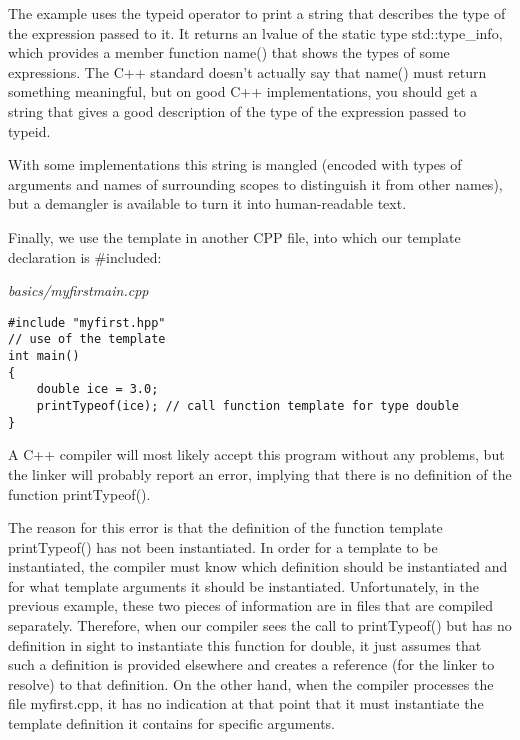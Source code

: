The example uses the typeid operator to print a string that describes the type of the expression passed to it. It returns an lvalue of the static type std::type\_info, which provides a member function name() that shows the types of some expressions. The C++ standard doesn’t actually say that name() must return something meaningful, but on good C++ implementations, you should get a string that gives a good description of the type of the expression passed to typeid.
 
\begin{tcolorbox}[colback=webgreen!5!white,colframe=webgreen!75!black]
\hspace*{0.75cm}With some implementations this string is mangled (encoded with types of arguments and names of surrounding scopes to distinguish it from other names), but a demangler is available to turn it into human-readable text.
\end{tcolorbox}

Finally, we use the template in another CPP file, into which our template declaration is \#included:

\noindent
\textit{basics/myfirstmain.cpp}
\begin{lstlisting}[style=styleCXX]
#include "myfirst.hpp"
// use of the template
int main()
{
	double ice = 3.0;
	printTypeof(ice); // call function template for type double
}
\end{lstlisting}

A C++ compiler will most likely accept this program without any problems, but the linker will probably report an error, implying that there is no definition of the function printTypeof().

The reason for this error is that the definition of the function template printTypeof() has not been instantiated. In order for a template to be instantiated, the compiler must know which definition should be instantiated and for what template arguments it should be instantiated. Unfortunately, in the previous example, these two pieces of information are in files that are compiled separately. Therefore, when our compiler sees the call to printTypeof() but has no definition in sight to instantiate this function for double, it just assumes that such a definition is provided elsewhere and creates a reference (for the linker to resolve) to that definition. On the other hand, when the compiler processes the file myfirst.cpp, it has no indication at that point that it must instantiate the template definition it contains for specific arguments.

